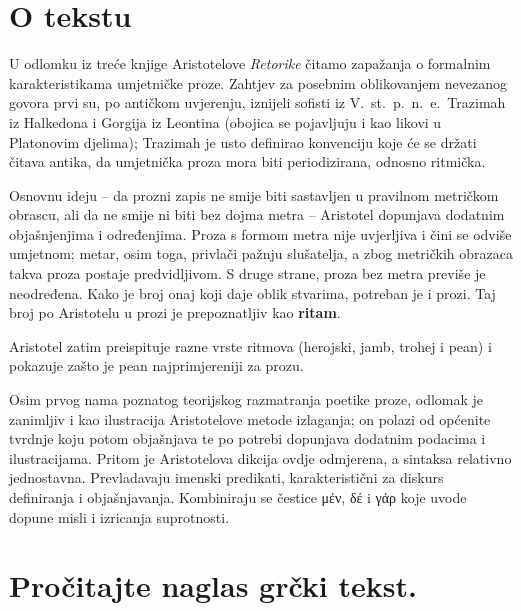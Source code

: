 


\section*{O tekstu}

U odlomku iz treće knjige Aristotelove \textit{Retorike} čitamo zapažanja o formalnim karakteristikama umjetničke proze. Zahtjev za posebnim oblikovanjem nevezanog govora prvi su, po antičkom uvjerenju, iznijeli sofisti iz V.~st.\ p.~n.~e.\ Trazimah iz Halkedona i Gorgija iz Leontina (obojica se pojavljuju i kao likovi u Platonovim djelima); Trazimah je usto definirao konvenciju koje će se držati čitava antika, da umjetnička proza mora biti periodizirana, odnosno ritmička.

Osnovnu ideju – da prozni zapis ne smije biti sastavljen u pravilnom metričkom obrascu, ali da ne smije ni biti bez dojma metra – Aristotel dopunjava dodatnim objašnjenjima i određenjima. Proza s formom metra nije uvjerljiva i čini se odviše umjetnom; metar, osim toga, privlači pažnju slušatelja, a zbog metričkih obrazaca takva proza postaje predvidljivom. S druge strane, proza bez metra previše je neodređena. Kako je broj onaj koji daje oblik stvarima, potreban je i prozi. Taj broj po Aristotelu u prozi je prepoznatljiv kao \textbf{ritam}. 

Aristotel zatim preispituje razne vrste ritmova (herojski, jamb, trohej i pean) i pokazuje zašto je pean najprimjereniji za prozu.

Osim prvog nama poznatog teorijskog razmatranja poetike proze, odlomak je zanimljiv i kao ilustracija Aristotelove metode izlaganja; on polazi od općenite tvrdnje koju potom objašnjava te po potrebi dopunjava dodatnim podacima i ilustracijama. Pritom je Aristotelova dikcija ovdje odmjerena, a sintaksa relativno jednostavna. Prevladavaju imenski predikati, karakteristični za diskurs definiranja i objašnjavanja. Kombiniraju se čestice μέν, δέ i γάρ koje uvode dopune misli i izricanja suprotnosti.


\newpage

\section*{Pročitajte naglas grčki tekst.}

